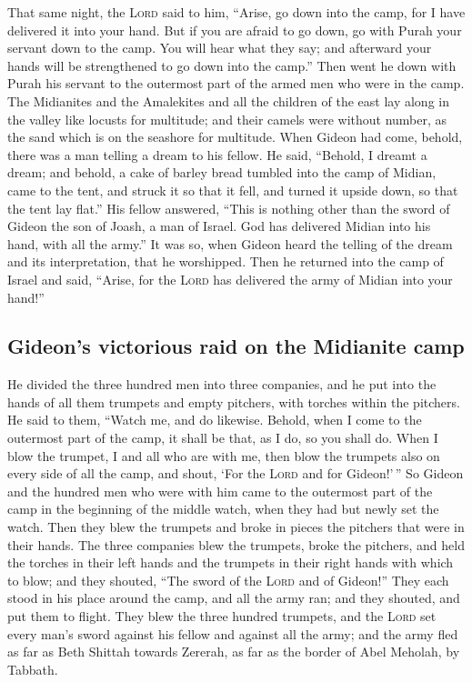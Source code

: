  That same night, the \textsc{Lord} said to him, ``Arise,
go down into the camp, for I have delivered it into your hand.
 But if you are afraid to go down, go with Purah your
servant down to the camp.  You will hear what they say;
and afterward your hands will be strengthened to go down into the
camp.'' Then went he down with Purah his servant to the outermost part
of the armed men who were in the camp.  The Midianites
and the Amalekites and all the children of the east lay along in the
valley like locusts for multitude; and their camels were without number,
as the sand which is on the seashore for multitude.  When
Gideon had come, behold, there was a man telling a dream to his fellow.
He said, ``Behold, I dreamt a dream; and behold, a cake of barley bread
tumbled into the camp of Midian, came to the tent, and struck it so that
it fell, and turned it upside down, so that the tent lay flat.''
 His fellow answered, ``This is nothing other than the
sword of Gideon the son of Joash, a man of Israel. God has delivered
Midian into his hand, with all the army.''  It was so,
when Gideon heard the telling of the dream and its interpretation, that
he worshipped. Then he returned into the camp of Israel and said,
``Arise, for the \textsc{Lord} has delivered the army of Midian into
your hand!''

\hypertarget{gideons-victorious-raid-on-the-midianite-camp}{%
\subsection{Gideon's victorious raid on the Midianite
camp}\label{gideons-victorious-raid-on-the-midianite-camp}}

 He divided the three hundred men into three companies,
and he put into the hands of all them trumpets and empty pitchers, with
torches within the pitchers.  He said to them, ``Watch
me, and do likewise. Behold, when I come to the outermost part of the
camp, it shall be that, as I do, so you shall do.  When I
blow the trumpet, I and all who are with me, then blow the trumpets also
on every side of all the camp, and shout, `For the \textsc{Lord} and for
Gideon!'\,''  So Gideon and the hundred men who were with
him came to the outermost part of the camp in the beginning of the
middle watch, when they had but newly set the watch. Then they blew the
trumpets and broke in pieces the pitchers that were in their hands.
 The three companies blew the trumpets, broke the
pitchers, and held the torches in their left hands and the trumpets in
their right hands with which to blow; and they shouted, ``The sword of
the \textsc{Lord} and of Gideon!''  They each stood in
his place around the camp, and all the army ran; and they shouted, and
put them to flight.  They blew the three hundred
trumpets, and the \textsc{Lord} set every man's sword against his fellow
and against all the army; and the army fled as far as Beth Shittah
towards Zererah, as far as the border of Abel Meholah, by Tabbath.

